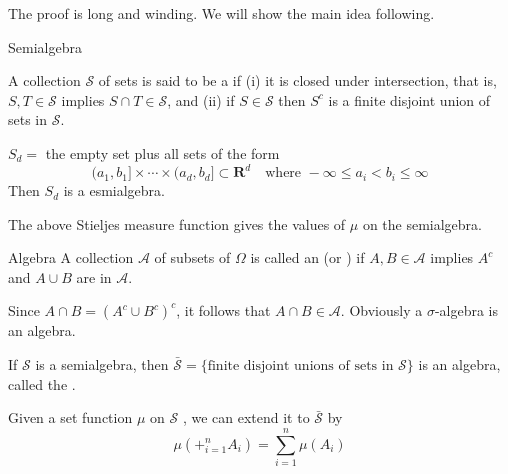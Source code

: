 \documentclass[../main.tex]{subfiles}
\begin{document}
\begin{remark}
    The proof is long and winding. We will show the main idea following. 
\end{remark}

\begin{definition}{Semialgebra}{}

A collection $\mathcal{S}$ of sets is said to be a  if (i) it is closed under intersection, that is, $S, T \in \mathcal{S}$ implies $S \cap T \in \mathcal{S}$, and (ii) if $S \in \mathcal{S}$ then $S^c$ is a finite disjoint union of sets in $\mathcal{S}$.

\end{definition}
\begin{example}{}{}
$S_d = $ the empty set plus all sets of the form
\[
(a_1, b_1] \times \cdots \times (a_d, b_d] \subset \mathbf{R}^d \quad \text{where } -\infty \le a_i < b_i \le \infty
\]
Then \(  S_{d}  \) is a esmialgebra. 
\end{example}
\begin{remark}
    The above Stieljes measure function gives the values of \(  \mu   \) on the semialgebra.  
\end{remark}
\begin{definition}{Algebra}{}
    A collection $\mathcal{A}$ of subsets of $\Omega$ is called an  (or ) if $A, B \in \mathcal{A}$ implies $A^c$ and $A \cup B$ are in $\mathcal{A}$.
\end{definition}

\begin{remark}
     Since $A \cap B = (A^c \cup B^c)^c$, it follows that $A \cap B \in \mathcal{A}$. Obviously a $\sigma$-algebra is an algebra. 
\end{remark}

\begin{lemma}{}{}
If $\mathcal{S}$ is a semialgebra, then $\bar{\mathcal{S}} = \{\text{finite disjoint unions of sets in } \mathcal{S}\}$ is an algebra, called the .
\end{lemma}

\begin{remark}
    Given a set function \(  \mu   \) on \(  \mathcal{S}  \) , we can extend it to \(  \bar{\mathcal{S}}  \) by \[
    \mu \left( + _{i= 1}^{n}A_{i} \right)= \sum _{i = 1}^{n}\mu \left( A_{i} \right)  
    \]   
\end{remark}
\end{document}
